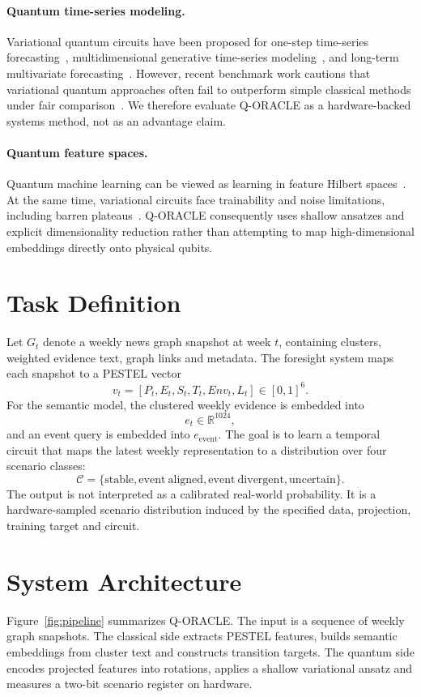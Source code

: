 \documentclass[10pt,twocolumn]{article}
\begin{document}
\paragraph{Quantum time-series modeling.}
Variational quantum circuits have been proposed for one-step time-series forecasting~\cite{kaushik2022onestep}, multidimensional generative time-series modeling~\cite{horowitz2022hamiltonian}, and long-term multivariate forecasting~\cite{chittoor2024qultsf}. However, recent benchmark work cautions that variational quantum approaches often fail to outperform simple classical methods under fair comparison~\cite{fellner2025benchmark}. We therefore evaluate Q-ORACLE as a hardware-backed systems method, not as an advantage claim.

\paragraph{Quantum feature spaces.}
Quantum machine learning can be viewed as learning in feature Hilbert spaces~\cite{schuld2019hilbert}. At the same time, variational circuits face trainability and noise limitations, including barren plateaus~\cite{larocca2024barren}. Q-ORACLE consequently uses shallow ansatzes and explicit dimensionality reduction rather than attempting to map high-dimensional embeddings directly onto physical qubits.

\section{Task Definition}
Let \(G_t\) denote a weekly news graph snapshot at week \(t\), containing clusters, weighted evidence text, graph links and metadata. The foresight system maps each snapshot to a PESTEL vector
\[
v_t=[P_t,E_t,S_t,T_t,Env_t,L_t]\in[0,1]^6.
\]
For the semantic model, the clustered weekly evidence is embedded into
\[
e_t \in \mathbb{R}^{1024},
\]
and an event query is embedded into \(e_\mathrm{event}\). The goal is to learn a temporal circuit that maps the latest weekly representation to a distribution over four scenario classes:
\[
\mathcal{C}=\{\mathrm{stable},\mathrm{event\ aligned},\mathrm{event\ divergent},\mathrm{uncertain}\}.
\]
The output is not interpreted as a calibrated real-world probability. It is a hardware-sampled scenario distribution induced by the specified data, projection, training target and circuit.

\section{System Architecture}
Figure~\ref{fig:pipeline} summarizes Q-ORACLE. The input is a sequence of weekly graph snapshots. The classical side extracts PESTEL features, builds semantic embeddings from cluster text and constructs transition targets. The quantum side encodes projected features into rotations, applies a shallow variational ansatz and measures a two-bit scenario register on hardware.
\end{document}
